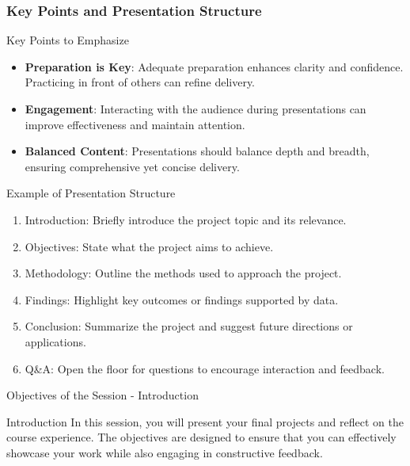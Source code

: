 \documentclass[aspectratio=169]{beamer}
\begin{document}
\begin{frame}[fragile]
    \frametitle{Key Points and Presentation Structure}
    \begin{block}{Key Points to Emphasize}
        \begin{itemize}
            \item \textbf{Preparation is Key}: Adequate preparation enhances clarity and confidence. Practicing in front of others can refine delivery.
            \item \textbf{Engagement}: Interacting with the audience during presentations can improve effectiveness and maintain attention.
            \item \textbf{Balanced Content}: Presentations should balance depth and breadth, ensuring comprehensive yet concise delivery.
        \end{itemize}
    \end{block}
    
    \begin{block}{Example of Presentation Structure}
        \begin{enumerate}
            \item Introduction: Briefly introduce the project topic and its relevance.
            \item Objectives: State what the project aims to achieve.
            \item Methodology: Outline the methods used to approach the project.
            \item Findings: Highlight key outcomes or findings supported by data.
            \item Conclusion: Summarize the project and suggest future directions or applications.
            \item Q\&A: Open the floor for questions to encourage interaction and feedback.
        \end{enumerate}
    \end{block}
\end{frame}

\begin{frame}[fragile]{Objectives of the Session - Introduction}
    \begin{block}{Introduction}
        In this session, you will present your final projects and reflect on the course experience. The objectives are designed to ensure that you can effectively showcase your work while also engaging in constructive feedback.
    \end{block}
\end{frame}
\end{document}
